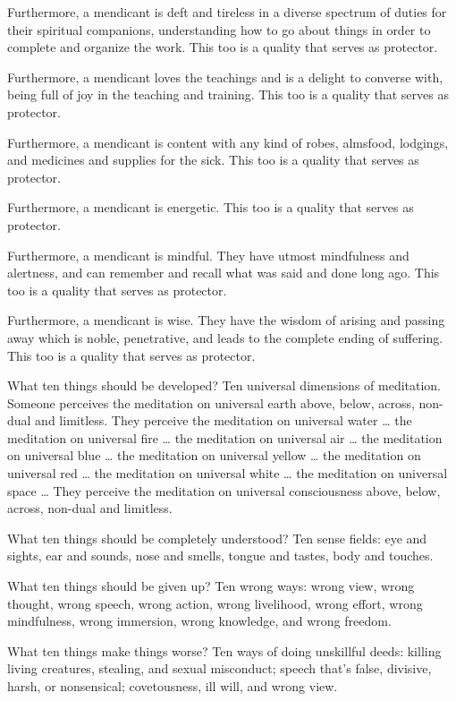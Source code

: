 \documentclass[12pt,openany]{book}%
\begin{document}
Furthermore, a mendicant is deft and tireless in a diverse spectrum of duties for their spiritual companions, understanding how to go about things in order to complete and organize the work. This too is a quality that serves as protector. 

Furthermore, a mendicant loves the teachings and is a delight to converse with, being full of joy in the teaching and training. This too is a quality that serves as protector. 

Furthermore, a mendicant is content with any kind of robes, almsfood, lodgings, and medicines and supplies for the sick. This too is a quality that serves as protector. 

Furthermore, a mendicant is energetic. This too is a quality that serves as protector. 

Furthermore, a mendicant is mindful. They have utmost mindfulness and alertness, and can remember and recall what was said and done long ago. This too is a quality that serves as protector. 

Furthermore, a mendicant is wise. They have the wisdom of arising and passing away which is noble, penetrative, and leads to the complete ending of suffering. This too is a quality that serves as protector. 

What ten things should be developed? Ten universal dimensions of meditation. Someone perceives the meditation on universal earth above, below, across, non-dual and limitless. They perceive the meditation on universal water … the meditation on universal fire … the meditation on universal air … the meditation on universal blue … the meditation on universal yellow … the meditation on universal red … the meditation on universal white … the meditation on universal space … They perceive the meditation on universal consciousness above, below, across, non-dual and limitless. 

What ten things should be completely understood? Ten sense fields: eye and sights, ear and sounds, nose and smells, tongue and tastes, body and touches. 

What ten things should be given up? Ten wrong ways: wrong view, wrong thought, wrong speech, wrong action, wrong livelihood, wrong effort, wrong mindfulness, wrong immersion, wrong knowledge, and wrong freedom. 

What ten things make things worse? Ten ways of doing unskillful deeds: killing living creatures, stealing, and sexual misconduct; speech that’s false, divisive, harsh, or nonsensical; covetousness, ill will, and wrong view. 
\end{document}
